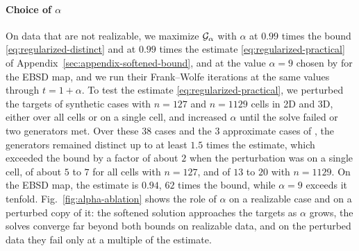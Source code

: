 \documentclass[main.tex]{subfiles}
\begin{document}
\paragraph{Choice of $\alpha$}
On data that are not realizable, we maximize $\mathcal{G}_\alpha$ with $\alpha$ at $0.99$ times the bound \eqref{eq:regularized-distinct} and at $0.99$ times the estimate \eqref{eq:regularized-practical} of Appendix~\ref{sec:appendix-softened-bound}, and at the value $\alpha \!=\! 9$ chosen by \citet{Bourne2026ConvexOrder} for the EBSD map, and we run their Frank--Wolfe iterations at the same values through $t \!=\! 1 + \alpha$.
To test the estimate \eqref{eq:regularized-practical}, we perturbed the targets of synthetic cases with $n \!=\! 127$ and $n \!=\! 1129$ cells in 2D and 3D, either over all cells or on a single cell, and increased $\alpha$ until the solve failed or two generators met.
Over these $38$ cases and the $3$ approximate cases of \citet{Bourne2025Inverting}, the generators remained distinct up to at least $1.5$ times the estimate, which exceeded the bound by a factor of about $2$ when the perturbation was on a single cell, of about $5$ to $7$ for all cells with $n \!=\! 127$, and of $13$ to $20$ with $n \!=\! 1129$.
On the EBSD map, the estimate is $0.94$, $62$ times the bound, while $\alpha \!=\! 9$ exceeds it tenfold.
Fig.~\ref{fig:alpha-ablation} shows the role of $\alpha$ on a realizable case and on a perturbed copy of it: the softened solution approaches the targets as $\alpha$ grows, the solves converge far beyond both bounds on realizable data, and on the perturbed data they fail only at a multiple of the estimate.
\end{document}
